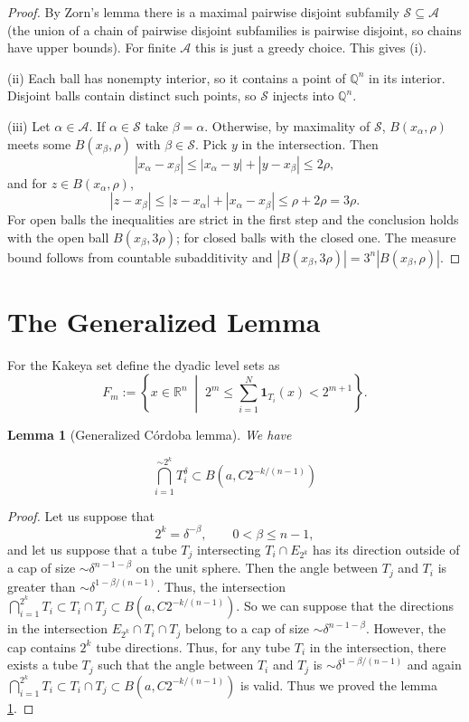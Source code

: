 \documentclass[11pt, letterpaper]{nyjm}
\newtheorem{lemma}[theorem]{Lemma}
\newcommand{\R}{\mathbb{R}}
\begin{document}
\begin{proof}
	By Zorn's lemma there is a maximal pairwise disjoint subfamily $\mathcal S\subseteq\mathcal A$
	(the union of a chain of pairwise disjoint subfamilies is pairwise disjoint, so chains have upper
	bounds). For finite $\mathcal A$ this is just a greedy choice. This gives (i).
	
	(ii) Each ball has nonempty interior, so it contains a point of $\mathbb Q^n$ in its interior.
	Disjoint balls contain distinct such points, so $\mathcal S$ injects into $\mathbb Q^n$.
	
	(iii) Let $\alpha\in\mathcal A$. If $\alpha\in\mathcal S$ take $\beta=\alpha$. Otherwise, by maximality of
	$\mathcal S$, $B(x_\alpha,\rho)$ meets some $B(x_\beta,\rho)$ with $\beta\in\mathcal S$. Pick $y$ in the
	intersection. Then
	\[
	|x_\alpha-x_\beta|\le|x_\alpha-y|+|y-x_\beta|\le2\rho,
	\]
	and for $z\in B(x_\alpha,\rho)$,
	\[
	|z-x_\beta|\le|z-x_\alpha|+|x_\alpha-x_\beta|\le\rho+2\rho=3\rho .
	\]
	For open balls the inequalities are strict in the first step and the conclusion holds with the
	open ball $B(x_\beta,3\rho)$; for closed balls with the closed one. The measure bound follows from
	countable subadditivity and $|B(x_\beta,3\rho)|=3^n|B(x_\beta,\rho)|$.
\end{proof}
\section{The Generalized Lemma}

For the Kakeya set define the  dyadic level sets as 
\[
F_m := \left\{ x \in \R^n \;\middle|\; 2^{m} \leq \sum_{i=1}^{N}
\mathbf{1}_{T_i}(x) < 2^{m+1} \right\}.
\]

\begin{lemma}[Generalized C\'ordoba lemma] \label{lem:corgeneralized}
	We have 
	
	\[
	\bigcap_{i=1}^{\sim 2^{k}} T_i^{\delta} \subset B(a,C2^{-k/(n-1)})  
	\]
\end{lemma}

\begin{proof}
	Let us suppose that
	\[
	2^k=\delta^{-\beta},
	\qquad 0<\beta\leq n-1,
	\]
	and let us suppose that a tube $T_j$ intersecting
	$T_i\cap E_{2^k}$ has its direction outside of a cap of size
	$\sim\delta^{n-1-\beta}$ on the unit sphere. Then the angle between
	$T_j$ and $T_i$ is greater than $\sim\delta^{1-\beta/(n-1)}$.
	Thus, the intersection 
	$\bigcap_{i=1}^{2^k}T_i \subset T_i \cap T_j \subset B(a,C2^{-k/(n-1)}).$ 
	So we can suppose that the directions in the intersection
	$E_{2^k}\cap T_i\cap T_j$ belong to a cap of size
	$\sim\delta^{n-1-\beta}$. However, the cap contains $2^k$ tube
	directions. 
	Thus, for any tube $T_i$ in the intersection, there exists
	a tube $T_j$ such that the angle between $T_i$ and $T_j$ is
	$\sim\delta^{1-\beta/(n-1)}$ and again \\ $\bigcap_{i=1}^{2^k}T_i \subset T_i \cap T_j \subset B(a,C2^{-k/(n-1)})$ is valid.
	Thus we proved the lemma \ref{lem:corgeneralized}.
	
	
\end{proof}
\end{document}
